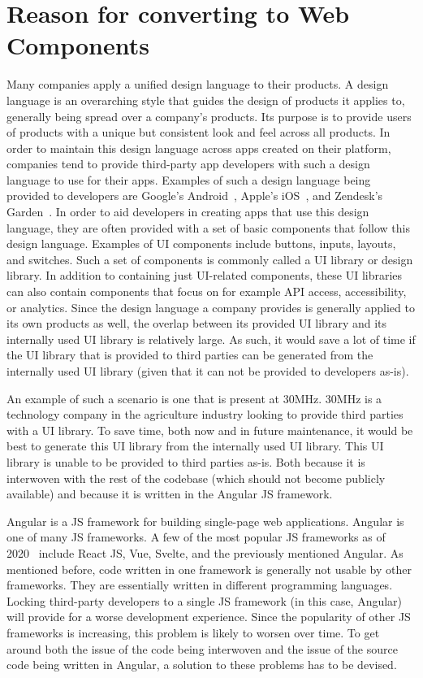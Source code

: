 \section{Reason for converting to Web Components}
Many companies apply a unified design language to their products. A design language is an overarching style that guides the design of products it applies to, generally being spread over a company's products. Its purpose is to provide users of products with a unique but consistent look and feel across all products. In order to maintain this design language across apps created on their platform, companies tend to provide third-party app developers with such a design language to use for their apps. Examples of such a design language being provided to developers are Google's Android~, Apple's iOS~, and Zendesk's Garden~. In order to aid developers in creating apps that use this design language, they are often provided with a set of basic components that follow this design language. Examples of UI components include buttons, inputs, layouts, and switches. Such a set of components is commonly called a UI library or design library. In addition to containing just UI-related components, these UI libraries can also contain components that focus on for example API access, accessibility, or analytics. Since the design language a company provides is generally applied to its own products as well, the overlap between its provided UI library and its internally used UI library is relatively large. As such, it would save a lot of time if the UI library that is provided to third parties can be generated from the internally used UI library (given that it can not be provided to developers as-is).

An example of such a scenario is one that is present at 30MHz. 30MHz is a technology company in the agriculture industry looking to provide third parties with a UI library. To save time, both now and in future maintenance, it would be best to generate this UI library from the internally used UI library. This UI library is unable to be provided to third parties as-is. Both because it is interwoven with the rest of the codebase (which should not become publicly available) and because it is written in the Angular JS framework.

Angular is a JS framework for building single-page web applications. Angular is one of many JS frameworks. A few of the most popular JS frameworks as of 2020~ include React JS, Vue, Svelte, and the previously mentioned Angular. As mentioned before, code written in one framework is generally not usable by other frameworks. They are essentially written in different programming languages. Locking third-party developers to a single JS framework (in this case, Angular) will provide for a worse development experience. Since the popularity of other JS frameworks is increasing, this problem is likely to worsen over time. To get around both the issue of the code being interwoven and the issue of the source code being written in Angular, a solution to these problems has to be devised.

